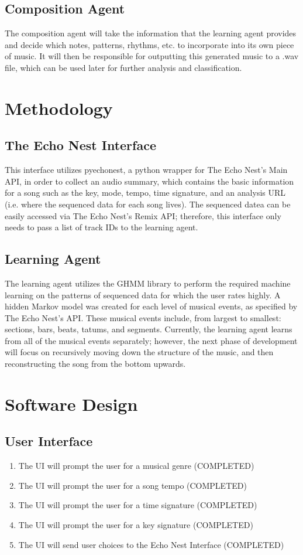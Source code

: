 \documentclass{article}
\begin{document}
\subsection{Composition Agent}
The composition agent will take the information that the learning agent provides and decide which notes,
patterns, rhythms, etc. to incorporate into its own piece of music. It will then be responsible for outputting
this generated music to a .wav file, which can be used later for further analysis and classification.

\section{Methodology}
\subsection{The Echo Nest Interface}
This interface utilizes pyechonest, a python wrapper for The Echo Nest's Main API, in order to collect an 
audio summary, which contains the basic information for a song such as the key, mode, tempo, time signature, 
and an analysis URL (i.e. where the sequenced data for each song lives). The sequenced datea
can be easily accessed via The Echo Nest's Remix API; therefore, this interface only needs to pass a list of
track IDs to the learning agent.

\subsection{Learning Agent}
The learning agent utilizes the GHMM library to perform the required machine learning on the patterns of
sequenced data for which the user rates highly. A hidden Markov model was created for each level of musical 
events, as specified by The Echo Nest's API. These musical events include, from largest to smallest:
sections, bars, beats, tatums, and segments. Currently, the learning agent learns from all of the musical
events separately; however, the next phase of development will focus on recursively moving down the structure
of the music, and then reconstructing the song from the bottom upwards.

\section{Software Design}
\subsection{User Interface}
\begin{enumerate}
\item The UI will prompt the user for a musical genre (COMPLETED)
\item The UI will prompt the user for a song tempo (COMPLETED)
\item The UI will prompt the user for a time signature (COMPLETED)
\item The UI will prompt the user for a key signature (COMPLETED)
\item The UI will send user choices to the Echo Nest Interface (COMPLETED)
\end{enumerate}
\end{document}
